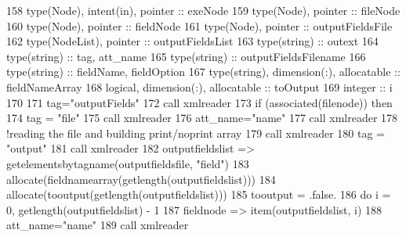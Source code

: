 \begin{DoxyCode}
158     \textcolor{keywordtype}{type}(Node), \textcolor{keywordtype}{intent(in)}, \textcolor{keywordtype}{pointer} :: exeNode
159     \textcolor{keywordtype}{type}(Node), \textcolor{keywordtype}{pointer} :: fileNode
160     \textcolor{keywordtype}{type}(Node), \textcolor{keywordtype}{pointer} :: fieldNode
161     \textcolor{keywordtype}{type}(Node), \textcolor{keywordtype}{pointer} :: outputFieldsFile
162     \textcolor{keywordtype}{type}(NodeList), \textcolor{keywordtype}{pointer} :: outputFieldsList
163     \textcolor{keywordtype}{type}(string) :: outext
164     \textcolor{keywordtype}{type}(string) :: tag, att\_name
165     \textcolor{keywordtype}{type}(string) :: outputFieldsFilename
166     \textcolor{keywordtype}{type}(string) :: fieldName, fieldOption
167     \textcolor{keywordtype}{type}(string), \textcolor{keywordtype}{dimension(:)}, \textcolor{keywordtype}{allocatable} :: fieldNameArray
168     \textcolor{keywordtype}{logical}, \textcolor{keywordtype}{dimension(:)}, \textcolor{keywordtype}{allocatable} :: toOutput
169     \textcolor{keywordtype}{integer} :: i
170     
171     tag=\textcolor{stringliteral}{"outputFields"} 
172     \textcolor{keyword}{call }xmlreader%
173     \textcolor{keywordflow}{if} (\textcolor{keyword}{associated}(filenode)) \textcolor{keywordflow}{then}
174         tag = \textcolor{stringliteral}{"file"}
175         \textcolor{keyword}{call }xmlreader%
176         att\_name=\textcolor{stringliteral}{"name"}
177         \textcolor{keyword}{call }xmlreader%
178         \textcolor{comment}{!reading the file and building print/noprint array}
179         \textcolor{keyword}{call }xmlreader%
180         tag = \textcolor{stringliteral}{"output"}
181         \textcolor{keyword}{call }xmlreader%
182         outputfieldslist => getelementsbytagname(outputfieldsfile, \textcolor{stringliteral}{"field"})
183         \textcolor{keyword}{allocate}(fieldnamearray(getlength(outputfieldslist)))
184         \textcolor{keyword}{allocate}(tooutput(getlength(outputfieldslist)))
185         tooutput = .false.
186         \textcolor{keywordflow}{do} i = 0, getlength(outputfieldslist) - 1
187             fieldnode => item(outputfieldslist, i)
188             att\_name=\textcolor{stringliteral}{"name"}
189             \textcolor{keyword}{call }xmlreader%

\end{DoxyCode}
